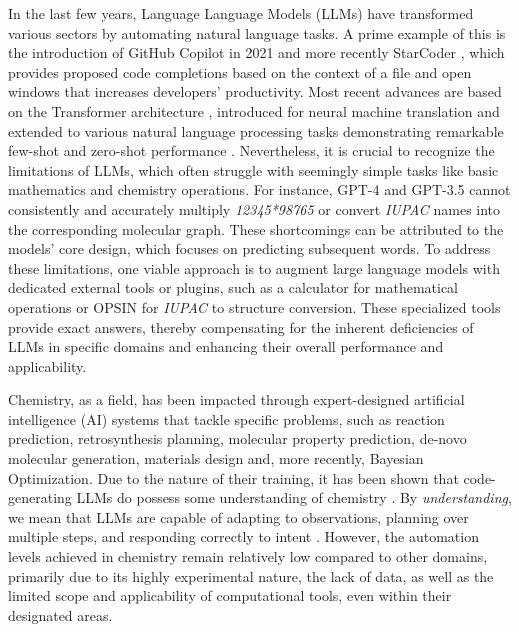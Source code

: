 \documentclass[10pt]{article}
\begin{document}
In the last few years, Language Language Models (LLMs) \cite{devlin2018bert, brown2020language,bommasani2021opportunities, chowdhery2022palm,sparksofagi} have transformed various sectors by automating natural language tasks. A prime example of this is the introduction of GitHub Copilot in 2021\cite{github_copilot} and more recently StarCoder \cite{li2023starcoder}, which provides proposed code completions based on the context of a file and open windows that increases developers' productivity\cite{ziegler2022productivity}. Most recent advances are based on the Transformer architecture \cite{vaswani2017attention}, introduced for neural machine translation and extended to various natural language processing tasks demonstrating remarkable few-shot and zero-shot performance \cite{brown2020language}. Nevertheless, it is crucial to recognize the limitations of LLMs, which often struggle with seemingly simple tasks like basic mathematics and chemistry operations\cite{schick2023toolformer, castro2023large}. For instance, GPT-4\cite{openai2023gpt4} and GPT-3.5\cite{ouyang2022training} cannot consistently and accurately multiply \emph{12345*98765} or convert \textit{IUPAC} names into the corresponding molecular graph\cite{white2023assessment}. These shortcomings can be attributed to the models' core design, which focuses on predicting subsequent words. To address these limitations, one viable approach is to augment large language models with dedicated external tools or plugins, such as a calculator for mathematical operations or OPSIN\cite{opsin} for \textit{IUPAC} to structure conversion. These specialized tools provide exact answers, thereby compensating for the inherent deficiencies of LLMs in specific domains and enhancing their overall performance and applicability.

Chemistry, as a field, has been impacted through expert-designed artificial intelligence (AI) systems that tackle specific problems, such as reaction prediction\cite{coley2017prediction, coley2019graph, schwaller2019molecular,Pesciullesi2020,irwin2022chemformer}, retrosynthesis planning\cite{szymkuc2016computer,segler2018planning,coley2019robotic,schwaller2020predicting,genheden2020aizynthfinder,molga2021chemist,schwaller2022machine}, molecular property prediction\cite{mayr2016deeptox,yang2019analyzing,chithrananda2020chemberta,van2022exposing,jablonka2023gpt}, de-novo molecular generation\cite{gomezbombarelli2018automatic,blaschke2020reinvent}, materials design\cite{tao_machine_2021, bombarelli_design} and, more recently, Bayesian Optimization\cite{shields2021bayesian,torres2022multi,ramos2023bayesian}. Due to the nature of their training, it has been shown that code-generating LLMs do possess some understanding of chemistry \cite{white2023assessment}. By \textit{understanding}, we mean that LLMs are capable of adapting to observations, planning over multiple steps, and responding correctly to intent \cite{marra2020integrating, wei2022chain, ho2022large,yao2022react, zelikman2022star, ouyang2022training}. However, the automation levels achieved in chemistry remain relatively low compared to other domains, primarily due to its highly experimental nature, the lack of data, as well as the limited scope and applicability of computational tools, even within their designated areas\cite{limit_ml1}. 
\end{document}
